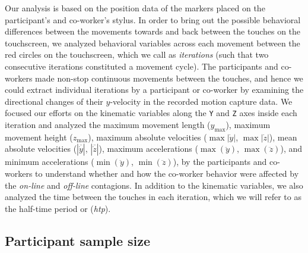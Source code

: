 Our analysis is based on the position data of the markers placed on the participant's and co-worker's stylus. In order to bring out the possible behavioral differences between the movements towards and back between the touches on the touchscreen, we analyzed behavioral variables across each movement between the red circles on the touchscreen, which we call as \textit{iterations} (such that two consecutive iterations constituted a movement cycle). The participants and co-workers made non-stop continuous movements between the touches, and hence we could extract individual iterations by a participant or co-worker by examining the directional changes of their $y$-velocity in the recorded motion capture data. We focused our efforts on the kinematic variables along the \texttt{Y} and \texttt{Z} axes inside each iteration and analyzed the maximum movement length ($y_{\max}$), maximum movement height ($z_{\max}$), maximum absolute velocities ($\max|\dot{y}|$, $\max|\dot{z}|$), mean absolute velocities ($|\overline{\dot{y}}|$, $|\overline{\dot{z}}|$), maximum accelerations ($\max(\ddot{y})$, $\max(\ddot{z})$), and minimum accelerations ($\min(\ddot{y})$, $\min(\ddot{z})$), by the participants and co-workers to understand whether and how the co-worker behavior were affected by the \textit{on-line} and \textit{off-line} contagions. In addition to the kinematic variables, we also analyzed the time between the touches in each iteration, which we will refer to as the half-time period or ({\it htp}).

\subsection{Participant sample size}

